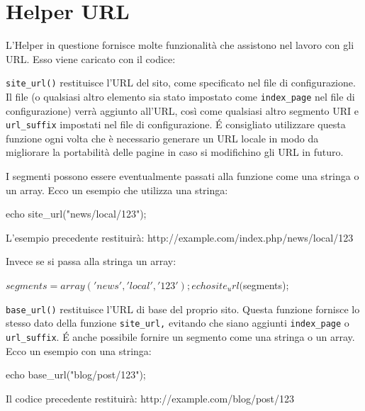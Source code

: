 \section{Helper URL}
\label{helper:url}

L'Helper in questione fornisce molte funzionalità che assistono nel lavoro con gli URL. Esso viene caricato con il codice:


\verb|site_url()| restituisce l'URL del sito, come specificato nel file di configurazione. Il file  (o qualsiasi altro elemento sia stato impostato come \verb|index_page| nel file di configurazione) verrà aggiunto all'URL, così come qualsiasi altro segmento URI e \verb|url_suffix| impostati nel file di configurazione. \'E consigliato utilizzare questa funzione ogni volta che è necessario generare un URL locale in modo da migliorare la portabilità delle pagine in caso si modifichino gli URL in futuro. 

I segmenti possono essere eventualmente passati alla funzione come una stringa o un array. Ecco un esempio che utilizza una stringa:

\begin{code}
echo site_url("news/local/123");
\end{code}

L'esempio precedente restituirà: http://example.com/index.php/news/local/123

Invece se si passa alla stringa un array:

\begin{code}
$segments = array('news', 'local', '123');

echo site_url($segments);
\end{code}

\verb|base_url()| restituisce l'URL di base del proprio sito. Questa funzione fornisce lo stesso dato della funzione \verb|site_url,| evitando che siano aggiunti \verb|index_page| o \verb|url_suffix|. \'E anche possibile fornire un segmento come una stringa o un array. Ecco un esempio con una stringa:

\begin{code}
echo base_url("blog/post/123");
\end{code}

Il codice precedente restituirà: http://example.com/blog/post/123

